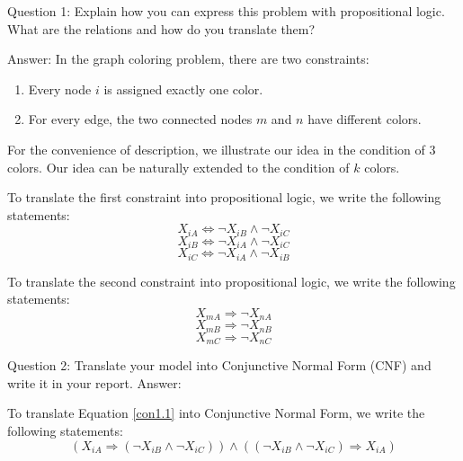 \documentclass[12pt, a4paper]{report}
\begin{document}
Question 1: Explain how you can express this problem with propositional logic. What are the relations and how do you translate them?

Answer:
In the graph coloring problem, there are two constraints:
\begin{enumerate}
    \item Every node $i$ is assigned exactly one color.
    \item For every edge, the two connected nodes $m$ and $n$ have different colors.
\end{enumerate}

For the convenience of description, we illustrate our idea in the condition of $3$ colors. Our idea can be naturally extended to the condition of $k$ colors.

To translate the first constraint into propositional logic, we write the following statements:
\begin{equation}
    \label{con1.1}
    X_{iA} \Leftrightarrow \neg X_{iB} \wedge \neg X_{iC}
\end{equation}
\begin{equation}
    \label{con1.2}
    X_{iB} \Leftrightarrow \neg X_{iA} \wedge \neg X_{iC}
\end{equation}
\begin{equation}
    \label{con1.3}
    X_{iC} \Leftrightarrow \neg X_{iA} \wedge \neg X_{iB}
\end{equation}


To translate the second constraint into propositional logic, we write the following statements:
\begin{equation}
    \label{con2.1}
    X_{mA} \Rightarrow \neg X_{nA}
\end{equation}
\begin{equation}
    \label{con2.2}
    X_{mB} \Rightarrow \neg X_{nB}
\end{equation}
\begin{equation}
    \label{con2.3}
    X_{mC} \Rightarrow \neg X_{nC}
\end{equation}



Question 2: Translate your model into Conjunctive Normal Form (CNF) and write it in your report.
Answer:

To translate Equation \ref{con1.1} into Conjunctive Normal Form, we write the following statements:
\begin{equation}
    (X_{iA} \Rightarrow (\neg X_{iB} \wedge \neg X_{iC})) \wedge ((\neg X_{iB} \wedge \neg X_{iC}) \Rightarrow X_{iA} )
\end{equation}
\end{document}
